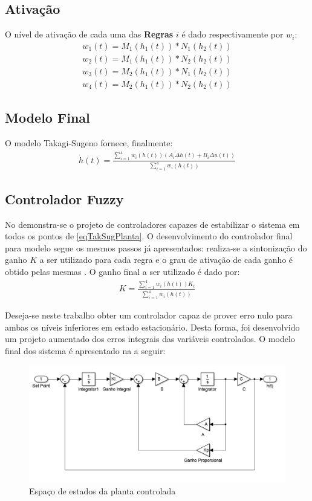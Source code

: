 \subsection{Ativação}
O nível de ativação de cada uma das \textbf{Regras} $i$ é dado respectivamente por $w_i$:
	\begin{equation}
	\begin{aligned}
		w_{1}(t) = M_1(h_1(t)) * N_1(h_2(t)) \\
		w_{2}(t) = M_1(h_1(t)) * N_2(h_2(t)) \\
		w_{3}(t) = M_2(h_1(t)) * N_1(h_2(t)) \\
		w_{4}(t) = M_2(h_1(t)) * N_2(h_2(t))
	\end{aligned}
	\label{eqGrauAtiv4T}
	\end{equation}
	
\subsection{Modelo Final}
O modelo Takagi-Sugeno fornece, finalmente:
	\begin{align} \label{eqTakSugPlanta}
		\dot{h}(t) = \frac{\sum_{i=1}^{4}  w_i(h(t))(A_i \Delta h(t) +  B_i \Delta u(t))}{\sum_{i=1}^{4} w_i(h(t))}
	\end{align}

\subsection{Controlador Fuzzy}
No  demonstra-se o projeto de controladores capazes de estabilizar o sistema em todos os pontos de \ref{eqTakSugPlanta}. O desenvolvimento do controlador final para modelo segue os mesmos passos já apresentados: realiza-se a sintonização do ganho $K$ a ser utilizado para cada regra e o grau de ativação de cada ganho é obtido pelas mesmas .
 O ganho final a ser utilizado é dado por:
	\begin{align}
		K = \frac{\sum_{i=1}^{4}  w_i(h(t))K_i}{\sum_{i=1}^{4} w_i(h(t))}
	\end{align}

Deseja-se neste trabalho obter um controlador capaz de prover erro nulo para ambas os níveis inferiores em estado estacionário. Desta forma, foi desenvolvido um projeto aumentado dos erros integrais das variáveis controlados. O modelo final dos sistema é apresentado na  a seguir:

\begin{figure}[H]
	\begin{centering}
		\includegraphics[width=\textwidth]{img/modelo_controlado.png}
		\par\end{centering}
	\caption{\label{figSimPlantCtrl}Espaço de estados da planta controlada}
\end{figure}

%

